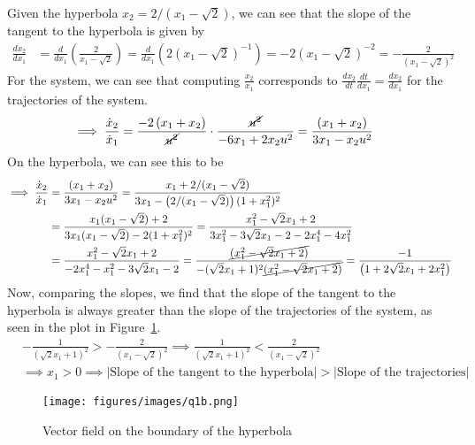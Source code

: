 Given the hyperbola \( x_2 = 2 / (x_1 - \sqrt{2}) \), we can see that the slope of the tangent to the hyperbola is given by
\begin{align*}
    \frac{d x_2}{d x_1}
     & =
    \frac{d}{d x_1} \left( \frac{2}{x_1 - \sqrt{2}} \right)
    =
    \frac{d}{d x_1} \left( 2 (x_1 - \sqrt{2})^{-1} \right)
    =
    -2 (x_1 - \sqrt{2})^{-2}
    =
    -\frac{2}{(x_1 - \sqrt{2})^2}
\end{align*}
For the system, we can see that computing \( \frac{\dot{x}_2}{\dot{x}_1} \) corresponds to \( \frac{dx_2}{dt} \frac{dt}{d x_1} = \frac{dx_2}{d x_1} \) for the trajectories of the system.
\begin{align*}
    \implies
    \frac{\dot{x}_2}{\dot{x}_1}
     & =
    \frac{-2\left(x_{1}+x_{2}\right)}{\cancel{u^{2}}}
    \cdot
    \frac{\cancel{u^{2}}}{-6 x_{1}+2 x_{2} u^2}
    =
    \frac{\left(x_{1}+x_{2}\right)}{3 x_{1} - x_{2} u^2}
\end{align*}
On the hyperbola, we can see this to be
\begin{align*}
    \implies
    \frac{\dot{x}_2}{\dot{x}_1}
     & =
    \frac{\left(x_{1}+x_{2}\right)}{3 x_{1} - x_{2} u^2}
    =
    \frac{x_1 + 2 / (x_1 - \sqrt{2})}{3 x_1 - \left( 2 / (x_1 - \sqrt{2}) \right) (1+x_1^2)^2}
    \\ & =
    \frac{x_1 (x_1 - \sqrt{2}) + 2}{3 x_1 (x_1 - \sqrt{2}) - 2 (1+x_1^2)^2}
    =
    \frac{x_1^2 - \sqrt{2} x_1 + 2}{3 x_1^2 - 3 \sqrt{2} x_1 - 2 - 2 x_1^4 - 4 x_1^2}
    \\ & =
    \frac{x_1^2 - \sqrt{2} x_1 + 2}{-2 x_1^4 - x_1^2 - 3 \sqrt{2} x_1 - 2}
    =
    \frac{\cancel{(x_1^2 - \sqrt{2} x_1 + 2)}}{-(\sqrt{2} x_{1}+ 1)^2 \cancel{(x_1^2 - \sqrt{2} x_1 + 2)}}
    =
    \frac{-1}{\left(1+2 \sqrt{2} x_{1}+2 x_{1}^{2}\right)}
\end{align*}
Now, comparing the slopes, we find that the slope of the tangent to the hyperbola is always greater than the slope of the trajectories of the system, as seen in the plot in Figure~\ref{fig:q1b}.
\begin{align*}
     &
    -\frac{1}{(\sqrt{2} x_{1}+ 1)^2}
    >
    -\frac{2}{(x_1 - \sqrt{2})^2}
    \implies
    \frac{1}{(\sqrt{2} x_{1}+ 1)^2}
    <
    \frac{2}{(x_1 - \sqrt{2})^2}
    \\ &
    \implies
    x_1  > 0
    \implies
    |\text{Slope of the tangent to the hyperbola}| > |\text{Slope of the trajectories}|
\end{align*}

\newpage
\begin{figure}[htb]
    \centering
    \texttt{[image: figures/images/q1b.png]}
    \caption{
        Vector field on the boundary of the hyperbola
    }\label{fig:q1b}
\end{figure}

